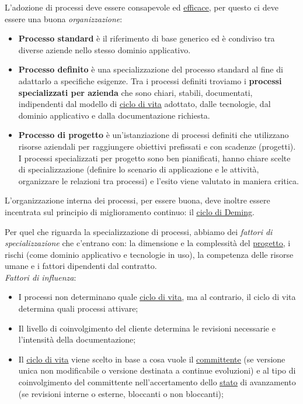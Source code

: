 		L'adozione di processi deve essere consapevole ed \underline{\hyperref[efficacia]{efficace}}, per questo ci deve essere una buona \textit{organizzazione}:
			\begin{itemize}
				\item \textbf{Processo standard} è il riferimento di base generico ed è condiviso tra diverse aziende nello stesso dominio applicativo.
				\item \textbf{Processo definito} è una specializzazione del processo standard al fine di adattarlo a specifiche esigenze. Tra i processi definiti troviamo i \textbf{processi specializzati per azienda} che sono chiari, stabili, documentati, indipendenti dal modello di \underline{\hyperref[ciclo]{ciclo di vita}} adottato, dalle tecnologie, dal dominio applicativo e dalla documentazione richiesta.
				\item \textbf{Processo di progetto} è un'istanziazione di processi definiti che utilizzano risorse aziendali per raggiungere obiettivi prefissati e con scadenze (progetti). I processi specializzati per progetto sono ben pianificati, hanno chiare scelte di specializzazione (definire lo scenario di applicazione e le attività, organizzare le relazioni tra processi) e l'esito viene valutato in maniera critica.
			\end{itemize}
		L'organizzazione interna dei processi, per essere buona, deve inoltre essere incentrata sul principio di miglioramento continuo: il \underline{\hyperref[pdca]{ciclo di Deming}}.
			
		Per quel che riguarda la specializzazione di processi, abbiamo dei \textit{fattori di specializzazione} che c'entrano con: la dimensione e la complessità del \underline{\hyperref[progetto]{progetto}}, i rischi (come dominio applicativo e tecnologie in uso), la competenza delle risorse umane e i fattori dipendenti dal contratto.\\
		\textit{Fattori di influenza}:
			\begin{itemize}
				\item I processi non determinano quale \underline{\hyperref[ciclo]{ciclo di vita}}, ma al contrario, il ciclo di vita determina quali processi attivare;
				\item Il livello di coinvolgimento del cliente determina le revisioni necessarie e l'intensità della documentazione;
				\item Il \underline{\hyperref[ciclo]{ciclo di vita}} viene scelto in base a cosa vuole il \underline{\hyperref[committente]{committente}} (se versione unica non modificabile o versione destinata a continue evoluzioni) e al tipo di coinvolgimento del committente nell'accertamento dello \underline{\hyperref[stato]{stato}} di avanzamento (se revisioni interne o esterne, bloccanti o non bloccanti);
			\end{itemize}
		
